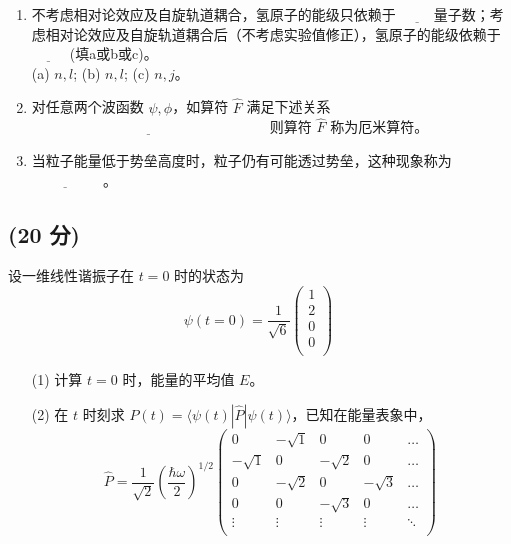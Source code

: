 \begin{enumerate}
    \item 不考虑相对论效应及自旋轨道耦合，氢原子的能级只依赖于 $\underline{\hspace{1cm}}$量子数；考虑相对论效应及自旋轨道耦合后（不考虑实验值修正），氢原子的能级依赖于 $\underline{\hspace{1cm}}$ (填a或b或c)。\\
   (a) $n, l$;  (b) $n, l$;  (c) $n, j$。
    \item 对任意两个波函数 $\psi, \phi$，如算符 $\hat{F}$ 满足下述关系 $\underline{\hspace{7cm}}$ 则算符 $\hat{F}$ 称为厄米算符。

    \item 当粒子能量低于势垒高度时，粒子仍有可能透过势垒，这种现象称为$\underline{\hspace{2cm}}$ 。
\end{enumerate}
\subsection{(20 分)}
设一维线性谐振子在 $t = 0$ 时的状态为
\[
\psi(t=0) = \frac{1}{\sqrt{6}}
\begin{pmatrix}
1 \\
2 \\
0 \\
0 \\
\end{pmatrix}~
\]

\begin{enumerate}
    \item [(1)] 计算 $t = 0$ 时，能量的平均值 $E$。
    
    \item [(2)] 在 $t$ 时刻求 $P(t) = \langle \psi(t) | \hat{P} | \psi(t) \rangle$，已知在能量表象中，
    \[
    \hat{P} = \frac{1}{\sqrt{2}} \left(\frac{\hbar \omega}{2}\right)^{1/2}
    \begin{pmatrix}
    0 & -\sqrt{1} & 0 & 0 & \dots \\
    -\sqrt{1} & 0 & -\sqrt{2} & 0 & \dots \\
    0 & -\sqrt{2} & 0 & -\sqrt{3} & \dots \\
    0 & 0 & -\sqrt{3} & 0 & \dots \\
    \vdots & \vdots & \vdots & \vdots & \ddots \\
    \end{pmatrix}~
    \]
\end{enumerate}
